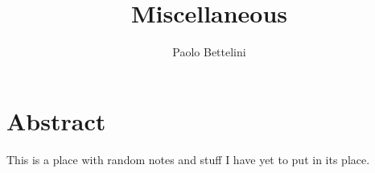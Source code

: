 \documentclass{article}
\title{Miscellaneous}
\author{Paolo Bettelini}
\date{}
\begin{document}
\maketitle
\tableofcontents
\pagebreak

\section{Abstract}

This is a place with random notes and stuff I have yet to put
in its place.

\pagebreak
\end{document}
